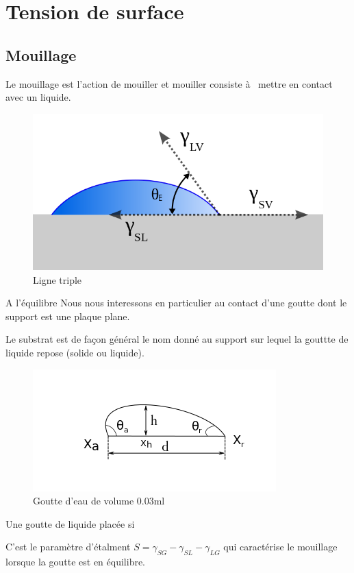 \documentclass[french]{article}
\begin{document}
\section{Tension de surface}
\subsection{Mouillage}
Le mouillage est l'action de mouiller et mouiller consiste à  mettre en contact avec un liquide.
\begin{figure}[ht]
	\centering
	\includegraphics[scale = 0.3]{./image/Contact_angle2.png}
	\caption{Ligne triple}
	\label{fig:mesure}
\end{figure}
 A l'équilibre
Nous nous interessons en particulier au contact d'une goutte dont le support est une plaque plane. 


Le substrat est de façon général le nom donné au support sur lequel la gouttte de liquide repose (solide ou liquide).

\begin{figure}[hb]
	\centering
	\includegraphics[scale = 0.8]{./image/rrgou.png}
	\caption{Goutte d'eau de volume $0.03$ml}
	\label{fig:mesure}
\end{figure}
Une goutte de liquide placée si 



C'est le paramètre d'étalment $S = \gamma_{SG} - \gamma_{SL} - \gamma_{LG}$ qui caractérise le mouillage lorsque la goutte est en équilibre.
\end{document}
